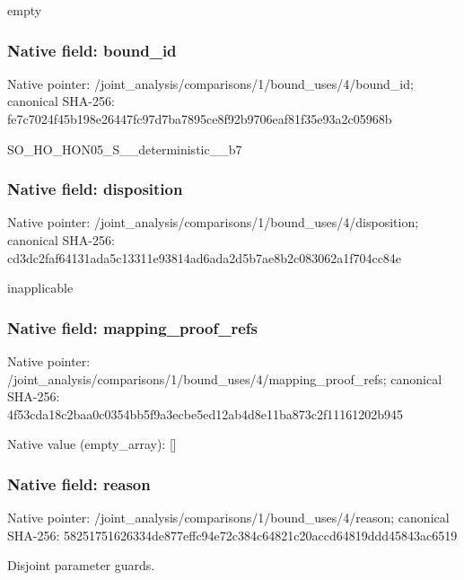 \documentclass[10pt,a4paper]{article}
\begin{document}
\begingroup\raggedright\sloppy empty\par\endgroup

\subsubsection{Native field: bound\_\allowbreak{}id}
Native pointer: /joint\_\allowbreak{}analysis/comparisons/1/bound\_\allowbreak{}uses/4/bound\_\allowbreak{}id; canonical SHA-256: fe7c7024f45b198e26447fc97d7ba7895ce8f92b9706eaf81f35e93a2c05968b

\begingroup\raggedright\sloppy SO\_\allowbreak{}HO\_\allowbreak{}HON05\_\allowbreak{}S\_\allowbreak{}\_\allowbreak{}deterministic\_\allowbreak{}\_\allowbreak{}b7\par\endgroup

\subsubsection{Native field: disposition}
Native pointer: /joint\_\allowbreak{}analysis/comparisons/1/bound\_\allowbreak{}uses/4/disposition; canonical SHA-256: cd3dc2faf64131ada5c13311e93814ad6ada2d5b7ae8b2c083062a1f704cc84e

\begingroup\raggedright\sloppy inapplicable\par\endgroup

\subsubsection{Native field: mapping\_\allowbreak{}proof\_\allowbreak{}refs}
Native pointer: /joint\_\allowbreak{}analysis/comparisons/1/bound\_\allowbreak{}uses/4/mapping\_\allowbreak{}proof\_\allowbreak{}refs; canonical SHA-256: 4f53cda18c2baa0c0354bb5f9a3ecbe5ed12ab4d8e11ba873c2f11161202b945

Native value (empty\_\allowbreak{}array): []

\subsubsection{Native field: reason}
Native pointer: /joint\_\allowbreak{}analysis/comparisons/1/bound\_\allowbreak{}uses/4/reason; canonical SHA-256: 58251751626334de877effc94e72c384c64821c20accd64819ddd45843ac6519

\begingroup\raggedright\sloppy Disjoint parameter guards.\par\endgroup
\end{document}
